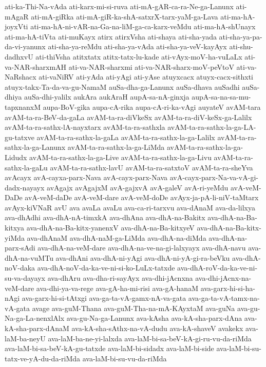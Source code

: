 {ati-ka-Thi-Na-vAda
ati-karx-mi-si-ruva
ati-mA-gAR-ca-ra-Ne-ga-Lanunx
ati-mAgaR
ati-mA-giRka
ati-mA-giR-ka-shA-satxrX-tarx-yaM-ga-Lava
ati-ma-hA-joyxVti
ati-ma-hA-ni-vAR-na-Ga-na-liM-ga-ca-karx-veMdu
ati-ma-hA-shUnayx
ati-ma-hA-tiVta
ati-muKayx
atirx
atirxVsha
ati-shaya
ati-sha-yada
ati-sha-ya-pa-da-vi-yanunx
ati-sha-ya-reMdu
ati-sha-ya-vAda
ati-sha-ya-veV-kayAyx
ati-shu-dadhxvU
ati-thiVsha
atitxtatx
atitx-tatx-lu-kade
ati-vAyx-moV-ha-vuLaLx
ati-va-NAR-sharxmAH
ati-va-NAR-sharxmi
ati-va-NAR-sharx-moV-peVtoV
ati-va-NaRshacx
ati-vaNiRV
ati-yAda
ati-yAgi
ati-yAse
atuyxcacx
atuyx-cacx-sithxti
atuyx-takx-Ta-da-va-gu-NamaM
auSa-dha-ga-Lanunx
auSa-dhava
auSadhi
auSa-dhiya
auSa-dhi-yalilx
aukAra
aukAraH
aupA-sa-nA-ginxja
aupA-sa-na-sa-mu-tapxnanxM
aupa-BoV-gika
aupa-cA-rika
aupa-cA-ri-ka-vAgi
auyateV
avAM-tara
avAM-ta-ra-BeV-da-gaLa
avAM-ta-ra-diVkeSx
avAM-ta-ra-diV-keSx-ga-Lalilx
avAM-ta-ra-sathx-lA-nayxtarx
avAM-ta-ra-sathxla
avAM-ta-ra-sathx-la-ga-LA-gu-tatxve
avAM-ta-ra-sathx-la-gaLa
avAM-ta-ra-sathx-la-ga-Lalilx
avAM-ta-ra-sathx-la-ga-Lanunx
avAM-ta-ra-sathx-la-ga-LiMda
avAM-ta-ra-sathx-la-ga-Lidudx
avAM-ta-ra-sathx-la-ga-Live
avAM-ta-ra-sathx-la-ga-Livu
avAM-ta-ra-sathx-la-gaLu
avAM-ta-ra-sathx-lavU
avAM-ta-ra-satxtoV
avAM-ta-ra-sheYva
avAcayx
avA-cayxa-parx-Nava
avA-cayx-parx-Nava
avA-cayx-parx-Na-va-vA-gi-dadx-nayayx
avAgajx
avAgajxM
avA-gajxvA
avA-galeV
avA-ri-yeMdu
avA-veM-DaDe
avA-veM-daDe
avA-veM-dare
avA-veM-doDe
avAyx-ja-pA-li-niV-taMtarx
avAyx-kiVNaR
avU
ava
avaLa
avaLu
ava-ca-ri-tarxvu
ava-dAnaM
ava-da-lilxya
ava-dhAdhi
ava-dhA-nA-timxkA
ava-dhAna
ava-dhA-na-Bakitx
ava-dhA-na-Ba-kitxya
ava-dhA-na-Ba-kitx-yanenxV
ava-dhA-na-Ba-kitxyeV
ava-dhA-na-Ba-kitx-yiMda
ava-dhAnaM
ava-dhA-naM-ga-LiMda
ava-dhA-na-diMda
ava-dhA-na-parx-sAdi
ava-dhA-na-veM-dare
ava-dhA-na-ve-na-gi-lalxyayx
ava-dhA-navu
ava-dhA-na-vuMTu
ava-dhAni
ava-dhA-ni-yAgi
ava-dhA-ni-yA-gi-ra-beVku
ava-dhA-noV-daka
ava-dhA-noV-da-ka-ve-ni-si-ko-LuLx-tatxde
ava-dhA-roV-da-ka-ve-ni-su-va-dayayx
ava-dhAru
ava-dha-ri-sayAyx
ava-dhi-jAcnxna
ava-dhi-jAcnx-na-veM-dare
ava-dhi-ya-va-rege
ava-gA-ha-mi-risi
ava-gA-hanaM
ava-garx-hi-si-ha-nAgi
ava-garx-hi-si-tAtxgi
ava-ga-ta-vA-gamx-nA-va-gata
ava-ga-ta-vA-tamx-na-vA-gata
avage
ava-guM-Thana
ava-guM-Tha-na-mA-KAyxtaM
ava-guNa
ava-gu-Na-ga-La-nenxlAlx
ava-gu-Na-ga-Lanunx
ava-kAsha
ava-kA-sha-parx-dAna
ava-kA-sha-parx-dAnaM
ava-kA-sha-sAthx-na-vA-dudu
ava-kA-shaveV
avakekx
ava-laM-ba-neyU
ava-laM-ba-ne-yi-lalxda
ava-laM-bi-sa-beV-kA-gi-ru-vu-da-riMda
ava-laM-bi-sa-beV-kA-gu-tatxde
ava-laM-bi-sidadx
ava-laM-bi-side
ava-laM-bi-su-tatx-ve-yA-du-da-riMda
ava-laM-bi-su-vu-da-riMda
}

